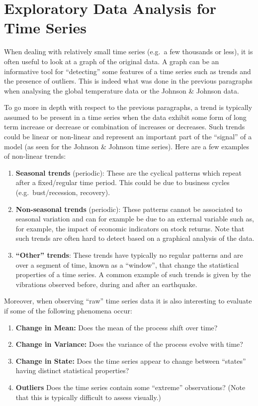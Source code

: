 \documentclass[]{book}
\providecommand{\tightlist}{%
  \setlength{\itemsep}{0pt}\setlength{\parskip}{0pt}}
\theoremstyle{definition}
\theoremstyle{definition}
\theoremstyle{definition}
\theoremstyle{remark}
\begin{document}
\section{Exploratory Data Analysis for Time Series}\label{eda}

When dealing with relatively small time series (e.g.~a few thousands or
less), it is often useful to look at a graph of the original data. A
graph can be an informative tool for ``detecting'' some features of a
time series such as trends and the presence of outliers. This is indeed
what was done in the previous paragraphs when analysing the global
temperature data or the Johnson \& Johnson data.

To go more in depth with respect to the previous paragraphs, a trend is
typically assumed to be present in a time series when the data exhibit
some form of long term increase or decrease or combination of increases
or decreases. Such trends could be linear or non-linear and represent an
important part of the ``signal'' of a model (as seen for the Johnson \&
Johnson time series). Here are a few examples of non-linear trends:

\begin{enumerate}
\def\labelenumi{\arabic{enumi}.}
\item
  \textbf{Seasonal trends} (periodic): These are the cyclical patterns
  which repeat after a fixed/regular time period. This could be due to
  business cycles (e.g.~bust/recession, recovery).
\item
  \textbf{Non-seasonal trends} (periodic): These patterns cannot be
  associated to seasonal variation and can for example be due to an
  external variable such as, for example, the impact of economic
  indicators on stock returns. Note that such trends are often hard to
  detect based on a graphical analysis of the data.
\item
  \textbf{``Other'' trends}: These trends have typically no regular
  patterns and are over a segment of time, known as a ``window'', that
  change the statistical properties of a time series. A common example
  of such trends is given by the vibrations observed before, during and
  after an earthquake.
\end{enumerate}

Moreover, when observing ``raw'' time series data it is also interesting
to evaluate if some of the following phenomena occur:

\begin{enumerate}
\def\labelenumi{\arabic{enumi}.}
\tightlist
\item
  \textbf{Change in Mean:} Does the mean of the process shift over time?
\item
  \textbf{Change in Variance:} Does the variance of the process evolve
  with time?
\item
  \textbf{Change in State:} Does the time series appear to change
  between ``states'' having distinct statistical properties?
\item
  \textbf{Outliers} Does the time series contain some ``extreme''
  observations? (Note that this is typically difficult to assess
  visually.)
\end{enumerate}
\end{document}

